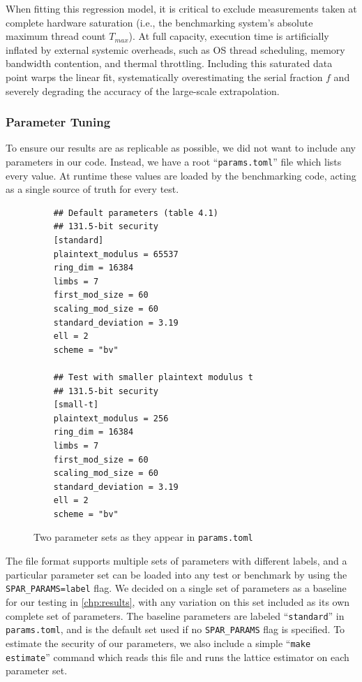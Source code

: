 When fitting this regression model, it is critical to exclude measurements taken at complete hardware saturation (i.e., the benchmarking system's absolute maximum thread count $T_{max}$). At full capacity, execution time is artificially inflated by external systemic overheads, such as OS thread scheduling, memory bandwidth contention, and thermal throttling. Including this saturated data point warps the linear fit, systematically overestimating the serial fraction $f$ and severely degrading the accuracy of the large-scale extrapolation.

\subsubsection{Parameter Tuning}
To ensure our results are as replicable as possible, we did not want to include any parameters in our code. Instead, we have a root ``\texttt{params.toml}'' file which lists every value. At runtime these values are loaded by the benchmarking code, acting as a single source of truth for every test.

\begin{figure}[!ht]
\centering
\begin{verbatim}
    ## Default parameters (table 4.1)
    ## 131.5-bit security
    [standard]
    plaintext_modulus = 65537
    ring_dim = 16384
    limbs = 7
    first_mod_size = 60
    scaling_mod_size = 60
    standard_deviation = 3.19
    ell = 2
    scheme = "bv"

    ## Test with smaller plaintext modulus t
    ## 131.5-bit security
    [small-t]
    plaintext_modulus = 256
    ring_dim = 16384
    limbs = 7
    first_mod_size = 60
    scaling_mod_size = 60
    standard_deviation = 3.19
    ell = 2
    scheme = "bv"
\end{verbatim}
\caption{Two parameter sets as they appear in \texttt{params.toml}}\label{code:toml}
\end{figure}

The file format supports multiple sets of parameters with different labels, and a particular parameter set can be loaded into any test or benchmark by using the \texttt{SPAR\_PARAMS=label} flag. We decided on a single set of parameters as a baseline for our testing in \cref{chp:results}, with any variation on this set included as its own complete set of parameters. The baseline parameters are labeled ``\texttt{standard}'' in \texttt{params.toml}, and is the default set used if no \texttt{SPAR\_PARAMS} flag is specified. To estimate the security of our parameters, we also include a simple ``\texttt{make estimate}'' command which reads this file and runs the lattice estimator \cite{cryptoeprint:2015/046} on each parameter set.
